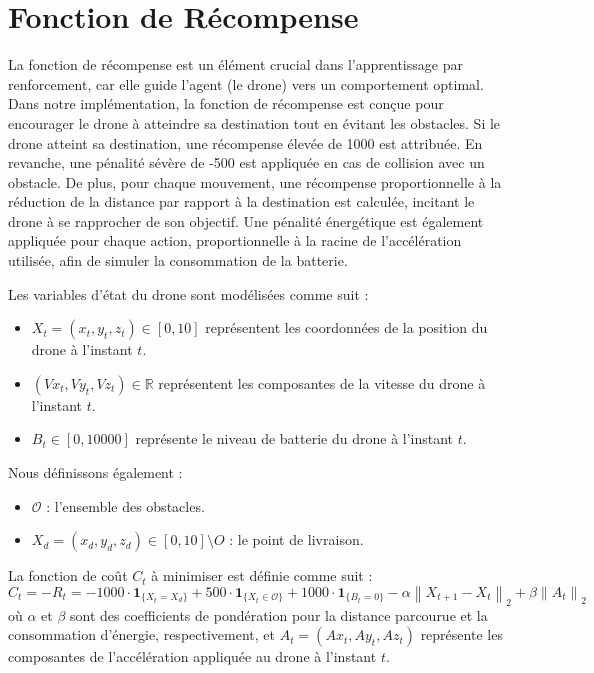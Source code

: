 \documentclass[a4paper, 12pt]{article}
\begin{document}
\section{Fonction de Récompense}
La fonction de récompense est un élément crucial dans l'apprentissage par renforcement, car elle guide l'agent (le drone) vers un comportement optimal. Dans notre implémentation, la fonction de récompense est conçue pour encourager le drone à atteindre sa destination tout en évitant les obstacles. Si le drone atteint sa destination, une récompense élevée de 1000 est attribuée. En revanche, une pénalité sévère de -500 est appliquée en cas de collision avec un obstacle. De plus, pour chaque mouvement, une récompense proportionnelle à la réduction de la distance par rapport à la destination est calculée, incitant le drone à se rapprocher de son objectif. Une pénalité énergétique est également appliquée pour chaque action, proportionnelle à la racine de l'accélération utilisée, afin de simuler la consommation de la batterie.

Les variables d'état du drone sont modélisées comme suit :
\begin{itemize}
    \item $X_t=(x_t, y_t, z_t) \in [0, 10]$ représentent les coordonnées de la position du drone à l'instant $t$.
    \item $(Vx_t, Vy_t, Vz_t) \in \mathbb{R}$ représentent les composantes de la vitesse du drone à l'instant $t$.
    \item $B_t \in [0, 10000]$ représente le niveau de batterie du drone à l'instant $t$.
\end{itemize}

Nous définissons également :
\begin{itemize}
    \item $\mathcal{O}$ : l'ensemble des obstacles.
    \item $X_{d}=(x_d,y_d,z_d) \in [0,10] \setminus O$ : le point de livraison.
   
\end{itemize}

La fonction de coût $C_t$ à minimiser est définie comme suit :
\[
C_t = -R_t = 
-1000 \cdot \mathbf{1}_{\{X_t = X_d\}} + 500 \cdot \mathbf{1}_{\{X_t \in \mathcal{O}\}} + 1000 \cdot \mathbf{1}_{\{B_t = 0\}} - \alpha \left\| X_{t+1} - X_t \right\|_2 + \beta \left\| A_t \right\|_2
\]
où $\alpha$ et $\beta$ sont des coefficients de pondération pour la distance parcourue et la consommation d'énergie, respectivement, et $A_t = (Ax_t, Ay_t, Az_t)$ représente les composantes de l'accélération appliquée au drone à l'instant $t$.
\newpage
\end{document}
